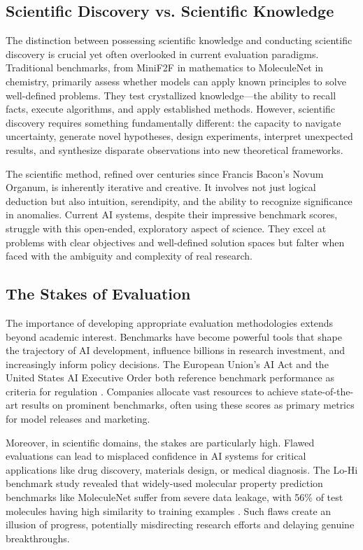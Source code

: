 \documentclass[10pt,twocolumn]{article}
\begin{document}
\subsection{Scientific Discovery vs. Scientific Knowledge}

The distinction between possessing scientific knowledge and conducting scientific discovery is crucial yet often overlooked in current evaluation paradigms. Traditional benchmarks, from MiniF2F in mathematics to MoleculeNet in chemistry, primarily assess whether models can apply known principles to solve well-defined problems. They test crystallized knowledge—the ability to recall facts, execute algorithms, and apply established methods. However, scientific discovery requires something fundamentally different: the capacity to navigate uncertainty, generate novel hypotheses, design experiments, interpret unexpected results, and synthesize disparate observations into new theoretical frameworks.

The scientific method, refined over centuries since Francis Bacon's Novum Organum, is inherently iterative and creative. It involves not just logical deduction but also intuition, serendipity, and the ability to recognize significance in anomalies. Current AI systems, despite their impressive benchmark scores, struggle with this open-ended, exploratory aspect of science. They excel at problems with clear objectives and well-defined solution spaces but falter when faced with the ambiguity and complexity of real research.

\subsection{The Stakes of Evaluation}

The importance of developing appropriate evaluation methodologies extends beyond academic interest. Benchmarks have become powerful tools that shape the trajectory of AI development, influence billions in research investment, and increasingly inform policy decisions. The European Union's AI Act and the United States AI Executive Order both reference benchmark performance as criteria for regulation \cite{arxiv2025trust}. Companies allocate vast resources to achieve state-of-the-art results on prominent benchmarks, often using these scores as primary metrics for model releases and marketing.

Moreover, in scientific domains, the stakes are particularly high. Flawed evaluations can lead to misplaced confidence in AI systems for critical applications like drug discovery, materials design, or medical diagnosis. The Lo-Hi benchmark study revealed that widely-used molecular property prediction benchmarks like MoleculeNet suffer from severe data leakage, with 56\% of test molecules having high similarity to training examples \cite{lohi2023}. Such flaws create an illusion of progress, potentially misdirecting research efforts and delaying genuine breakthroughs.
\end{document}

